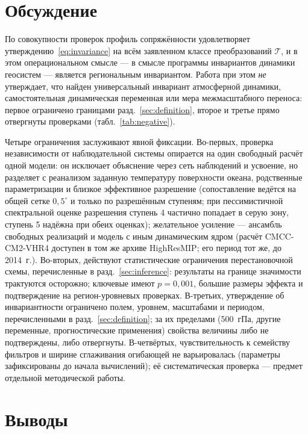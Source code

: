 \documentclass[11pt,a4paper]{article}
\begin{document}
\section{Обсуждение}
\label{sec:limitations}

По совокупности проверок профиль сопряжённости удовлетворяет утверждению~\eqref{eq:invariance} на всём заявленном классе преобразований $\mathcal{T}$, и в этом операциональном смысле --- в смысле программы инвариантов динамики геосистем \cite{Puzachenko2010} --- является региональным инвариантом. Работа при этом \emph{не} утверждает, что найден универсальный инвариант атмосферной динамики, самостоятельная динамическая переменная или мера межмасштабного переноса: первое ограничено границами разд.~\ref{sec:definition}, второе и третье прямо отвергнуты проверками (табл.~\ref{tab:negative}).

Четыре ограничения заслуживают явной фиксации. Во-первых, проверка независимости от наблюдательной системы опирается на один свободный расчёт одной модели: он исключает объяснение через сеть наблюдений и усвоение, но разделяет с реанализом заданную температуру поверхности океана, родственные параметризации и близкое эффективное разрешение (сопоставление ведётся на общей сетке $0{,}5^\circ$ и только по разрешённым ступеням; при пессимистичной спектральной оценке разрешения ступень 4 частично попадает в серую зону, ступень 5 надёжна при обеих оценках); желательное усиление --- ансамбль свободных реализаций и модель с иным динамическим ядром (расчёт CMCC-CM2-VHR4 доступен в том же архиве HighResMIP; его период тот же, до 2014~г.). Во-вторых, действуют статистические ограничения перестановочной схемы, перечисленные в разд.~\ref{sec:inference}: результаты на границе значимости трактуются осторожно; ключевые имеют $p=0{,}001$, большие размеры эффекта и подтверждение на регион-уровневых проверках. В-третьих, утверждение об инвариантности ограничено полем, уровнем, масштабами и периодом, перечисленными в разд.~\ref{sec:definition}; за их пределами (500~гПа, другие переменные, прогностические применения) свойства величины либо не подтверждены, либо отвергнуты. В-четвёртых, чувствительность к семейству фильтров и ширине сглаживания огибающей не варьировалась (параметры зафиксированы до начала вычислений); её систематическая проверка --- предмет отдельной методической работы.

\section{Выводы}
\label{sec:conclusion}
\end{document}
